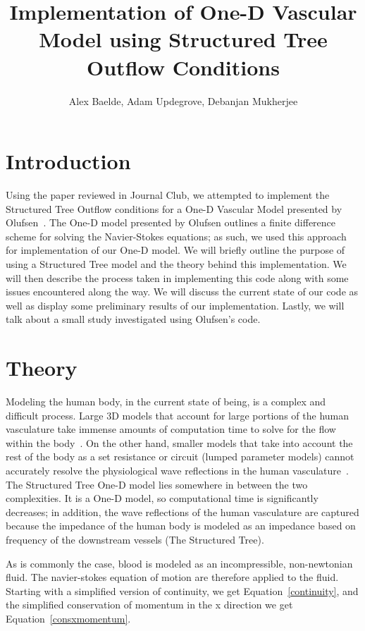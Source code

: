 \documentclass[12pt]{article}
\title{Implementation of One-D Vascular Model using Structured Tree Outflow Conditions}
\author{Alex Baelde, Adam Updegrove, Debanjan Mukherjee}
\begin{document}
\maketitle
\section{Introduction}
Using the paper reviewed in Journal Club, we attempted to implement the Structured Tree Outflow conditions for a One-D Vascular Model presented by Olufsen~\cite{olufsen}. The One-D model presented by Olufsen outlines a finite difference scheme for solving the Navier-Stokes equations; as such, we used this approach for implementation of our One-D model. We will briefly outline the purpose of using a Structured Tree model and the theory behind this implementation.%
We will then describe the process taken in implementing this code along with some issues encountered along the way. We will discuss the current state of our code as well as display some preliminary results of our implementation. Lastly, we will talk about a small study investigated using Olufsen's code. 

\section{Theory}

Modeling the human body, in the current state of being, is a complex and difficult process. Large 3D models that account for large portions of the human vasculature take immense amounts of computation time to solve for the flow within the body~\cite{someone}. On the other hand, smaller models that take into account the rest of the body as a set resistance or circuit (lumped parameter models) cannot accurately resolve the physiological wave reflections in the human vasculature~\cite{someone}. The Structured Tree One-D model lies somewhere in between the two complexities. It is a One-D model, so computational time is significantly decreases; in addition, the wave reflections of the human vasculature are captured because the impedance of the human body is modeled as an impedance based on frequency of the downstream vessels (The Structured Tree). %

As is commonly the case, blood is modeled as an incompressible, non-newtonian fluid. The navier-stokes equation of motion are therefore applied to the fluid. Starting with a simplified version of continuity, we get Equation~\eqref{continuity}, and the simplified conservation of momentum in the x direction we get Equation~\eqref{consxmomentum}.
\end{document}
